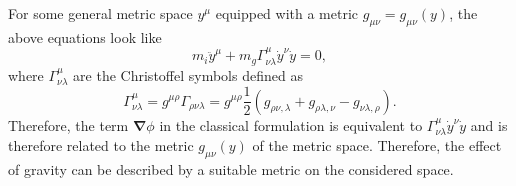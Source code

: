 \documentclass[a4paper,11pt]{article}
\numberwithin{equation}{section}
\newcommand\vect[1]{\ensuremath{\bm{#1}}}
\begin{document}
{For some general metric space $y^\mu$ equipped with a metric $g_{\mu\nu}=g_{\mu\nu}(y)$, the above equations look like \begin{equation}
m_i \ddot{y}^\mu + m_g\Gamma^\mu_{\nu\lambda}\dot{y}^\nu\dot{y} = 0,
\end{equation} where $\Gamma^\mu_{\nu\lambda}$ are the Christoffel symbols defined as \begin{equation}
\Gamma^{\mu}_{\nu\lambda} = g^{\mu\rho}\Gamma_{\rho\nu\lambda} = g^{\mu\rho}\frac{1}{2}\left(g_{\rho\nu,\lambda} + g_{\rho\lambda,\nu}-g_{\nu\lambda,\rho}\right).
\end{equation} Therefore, the term $\vect{\nabla}\phi$ in the classical formulation is equivalent to $\Gamma^\mu_{\nu\lambda}\dot{y}^\nu\dot{y}$ and is therefore related to the metric $g_{\mu\nu}(y)$ of the metric space. Therefore, the effect of gravity can be described by a suitable metric on the considered space.
}

\end{document}
